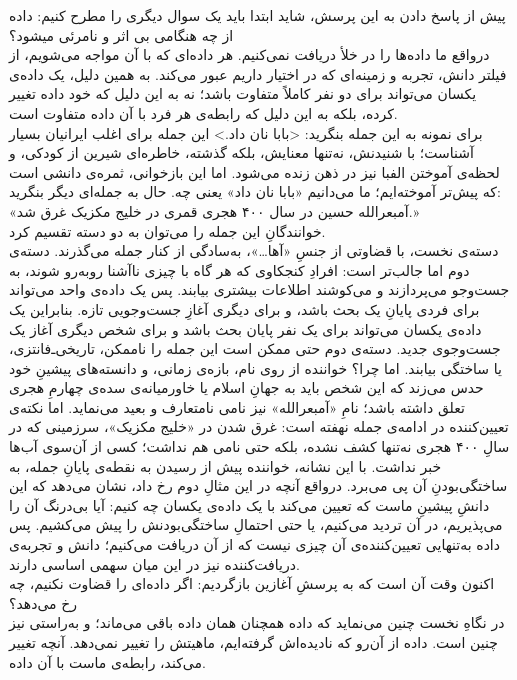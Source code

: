 پیش از پاسخ دادن به این پرسش، شاید ابتدا باید یک سوال دیگری را مطرح کنیم: داده از چه هنگامی بی اثر و نامرئی میشود؟ \\
درواقع ما داده‌ها را در خلأ دریافت نمی‌کنیم. هر داده‌ای که با آن مواجه می‌شویم، از فیلتر دانش، تجربه و زمینه‌ای که در اختیار داریم عبور می‌کند. به همین دلیل، یک داده‌ی یکسان می‌تواند برای دو نفر کاملاً متفاوت باشد؛ نه به این دلیل که خود داده تغییر کرده، بلکه به این دلیل که رابطه‌ی هر فرد با آن داده متفاوت است.\\
برای نمونه به این جمله بنگرید: <بابا نان داد.> این جمله برای اغلب ایرانیان بسیار آشناست؛  با شنیدنش، نه‌تنها معنایش، بلکه گذشته، خاطره‌ای شیرین از کودکی، و لحظه‌ی آموختن الفبا نیز در ذهن زنده می‌شود. اما این بازخوانی، ثمره‌ی دانشی است که پیش‌تر آموخته‌ایم؛ ما می‌دانیم «بابا نان داد» یعنی چه. حال به جمله‌ای دیگر بنگرید:\\
«آمبعرالله حسین در سال ۴۰۰ هجری قمری در خلیج مکزیک غرق شد.»\\
خوانندگانِ این جمله را می‌توان به دو دسته تقسیم کرد.\\
دسته‌ی نخست، با قضاوتی از جنسِ «آها…»، به‌سادگی از کنار جمله می‌گذرند. دسته‌ی دوم اما جالب‌تر است: افرادِ کنجکاوی که هر گاه با چیزی ناآشنا روبه‌رو شوند، به جست‌وجو می‌پردازند و می‌کوشند اطلاعات بیشتری بیابند. پس یک داده‌ی واحد می‌تواند برای فردی پایانِ یک بحث باشد، و برای دیگری آغازِ جست‌وجویی تازه.  بنابراین یک داده‌ی یکسان می‌تواند برای یک نفر پایان بحث باشد و برای شخص دیگری آغاز یک جست‌وجوی جدید. 
دسته‌ی دوم حتی ممکن است این جمله را ناممکن، تاریخی‌ـ‌فانتزی، یا ساختگی بیابند. اما چرا؟ خواننده از روی نام، بازه‌ی زمانی، و دانسته‌های پیشینِ خود حدس می‌زند که این شخص باید به جهانِ اسلام یا خاورمیانه‌ی سده‌ی چهارمِ هجری تعلق داشته باشد؛ نامِ «آمبعرالله» نیز نامی نامتعارف و بعید می‌نماید. اما نکته‌ی تعیین‌کننده در ادامه‌ی جمله نهفته است: غرق شدن در «خلیج مکزیک»، سرزمینی که در سالِ ۴۰۰ هجری نه‌تنها کشف نشده، بلکه حتی نامی هم نداشت؛ کسی از آن‌سوی آب‌ها خبر نداشت. با این نشانه، خواننده پیش از رسیدن به نقطه‌ی پایانِ جمله، به ساختگی‌بودنِ آن پی می‌برد. درواقع 
آنچه در این مثالِ دوم رخ داد، نشان می‌دهد که این دانشِ پیشینِ ماست که تعیین می‌کند با یک داده‌ی یکسان چه کنیم: آیا بی‌درنگ آن را می‌پذیریم، در آن تردید می‌کنیم، یا حتی احتمالِ ساختگی‌بودنش را پیش می‌کشیم. پس داده به‌تنهایی تعیین‌کننده‌ی آن چیزی نیست که از آن دریافت می‌کنیم؛ دانش و تجربه‌ی دریافت‌کننده نیز در این میان سهمی اساسی دارند.\\
اکنون وقت آن است که به پرسشِ آغازین بازگردیم: اگر داده‌ای را قضاوت نکنیم، چه رخ می‌دهد؟\\
در نگاهِ نخست چنین می‌نماید که داده همچنان همان داده باقی می‌ماند؛ و به‌راستی نیز چنین است. داده از آن‌رو که نادیده‌اش گرفته‌ایم، ماهیتش را تغییر نمی‌دهد. آنچه تغییر می‌کند، رابطه‌ی ماست با آن داده.

